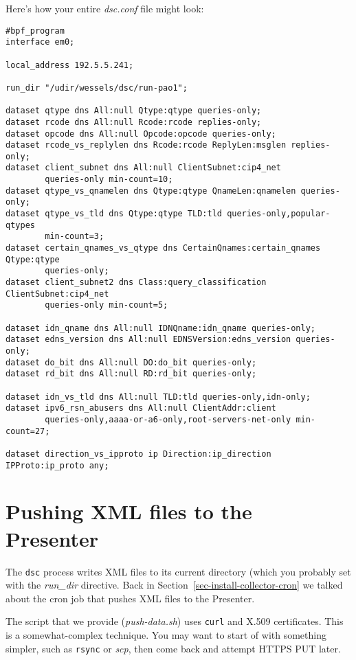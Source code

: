 \documentclass{report}
\begin{document}
Here's how your entire {\em dsc.conf\/} file might look:

\noindent\hrulefill

\begin{footnotesize}
\begin{verbatim}
#bpf_program
interface em0;

local_address 192.5.5.241;

run_dir "/udir/wessels/dsc/run-pao1";

dataset qtype dns All:null Qtype:qtype queries-only;
dataset rcode dns All:null Rcode:rcode replies-only;
dataset opcode dns All:null Opcode:opcode queries-only;
dataset rcode_vs_replylen dns Rcode:rcode ReplyLen:msglen replies-only;
dataset client_subnet dns All:null ClientSubnet:cip4_net
        queries-only min-count=10;
dataset qtype_vs_qnamelen dns Qtype:qtype QnameLen:qnamelen queries-only;
dataset qtype_vs_tld dns Qtype:qtype TLD:tld queries-only,popular-qtypes
        min-count=3;
dataset certain_qnames_vs_qtype dns CertainQnames:certain_qnames Qtype:qtype
        queries-only;
dataset client_subnet2 dns Class:query_classification ClientSubnet:cip4_net
        queries-only min-count=5;

dataset idn_qname dns All:null IDNQname:idn_qname queries-only;
dataset edns_version dns All:null EDNSVersion:edns_version queries-only;
dataset do_bit dns All:null DO:do_bit queries-only;
dataset rd_bit dns All:null RD:rd_bit queries-only;

dataset idn_vs_tld dns All:null TLD:tld queries-only,idn-only;
dataset ipv6_rsn_abusers dns All:null ClientAddr:client
        queries-only,aaaa-or-a6-only,root-servers-net-only min-count=27;

dataset direction_vs_ipproto ip Direction:ip_direction IPProto:ip_proto any;
\end{verbatim}
\end{footnotesize}

\noindent\hrulefill

\section{Pushing XML files to the Presenter}

The {\tt dsc\/} process writes XML files to its current directory
(which you probably set with the {\em run\_dir\/} directive.  Back
in Section~\ref{sec-install-collector-cron} we talked about the
cron job that pushes XML files to the Presenter.

The script that we provide ({\em push-data.sh\/}) uses {\tt curl\/}
and X.509 certificates.  This is a somewhat-complex technique.  You
may want to start of with something simpler, such as {\tt rsync\/}
or {\em scp\/}, then come back and attempt HTTPS PUT later.
\end{document}
